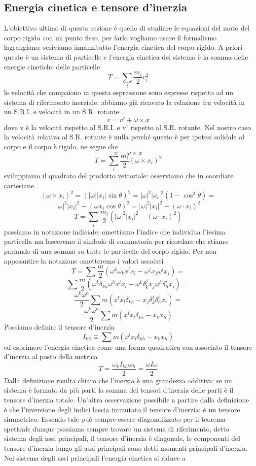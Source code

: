 \documentclass[
10pt, %
a4paper, %
oneside, %
headinclude,footinclude, %
BCOR5mm, %
]{scrartcl}
\begin{document}
 \subsection{Energia cinetica e tensore d'inerzia}
L'obiettivo ultimo di questa sezione è quello di studiare le equazioni del moto del corpo rigido con un punto fisso, per farlo vogliamo usare il formalismo lagrangiano: scriviamo innanzitutto l'energia cinetica del corpo rigido. A priori questo è un sistema di particelle e l'energia cinetica del sistema è la somma delle energie cinetiche delle particelle
\[T = \sum_i \frac{m_i}{2}v_i^2\]
le velocità che compaiono in questa espressione sono espresse rispetto ad un sistema di riferimento inerziale, abbiamo già ricavato la relazione fra velocità in un S.R.I. e velocità in un S.R. rotante
\[v = v'+\omega\times x\]
dove v è la velocità rispetto al S.R.I. e v' rispetto al S.R. rotante. Nel nostro caso la velocità relativa al S.R. rotante è nulla perché questo è per ipotesi solidale al corpo e il corpo è rigido, ne segue che
\[v = \omega\times x\]
\[T = \sum_i \frac{m_i}{2}(\omega\times x_i)^2\]
sviluppiamo il quadrato del prodotto vettoriale: osserviamo che in coordiate cartesiane
\[(\omega\times x_i)^2 = (|\omega| |x_i|\sin\theta)^2 = |\omega|^2|x_i|^2(1-\cos^2\theta) =\]
\[|\omega|^2|x_i|^2-(\omega x_i\cos\theta)^2 = |\omega|^2|x_i|^2-(\omega\cdot x_i)^2  \]
\[T = \sum_i \frac{m_i}{2}(|\omega|^2|x_i|^2-(\omega\cdot x_i)^2)\]
passiamo in notazione indiciale: omettiamo l'indice che individua l'iesima particella ma lasceremo il simbolo di sommatoria per ricordare che stiamo parlando di una somma su tutte le particelle del corpo rigido.  Per non appesantire la notazione ometteremo i valori assoluti
\[T = \sum \frac{m}{2}(\omega^k\omega_k x^lx_l-\omega^j x_j\omega^i x_i) =\]
\[ \sum \frac{m}{2}(\omega^k\delta_{kh}\omega^h x^lx_l-\omega^k\delta^{j}_k x_j\omega^h\delta^{i}_h x_i) =  \]
\[\frac{\omega^k\omega^h}{2} \sum m( x^lx_l\delta_{kh}- x_j\delta^{j}_k\delta^{i}_h x_i) = \]
\[\frac{\omega^k\omega^h}{2} \sum m( x^lx_l\delta_{kh}- x_kx_h)\]
Possiamo definire il tensore d'inerzia
\[I_{kh} \equiv \sum m( x^lx_l\delta_{kh}- x_kx_h) \]
ed esprimere l'energia cinetica come una forma quadratica con associato il tensore d'inerzia al posto della metrica
\[T=\frac{\omega_kI_{kh}\omega_h}{2} = \frac{\omega I\omega}{2} \]
Dalla definizione risulta chiaro che l'inerzia è una grandezza additiva: se un sistema è formato da più parti la somma dei tensori d'inerzia delle parti è il tensore d'inerzia totale.
Un'altra osservazione possibile a partire dalla definizione è che l'inversione degli indici lascia immutato il tensore d'inerzia: è un tensore simmetrico. Essendo tale può sempre essere diagonalizzato per il teorema spettrale dunque possiamo sempre trovare un sistema di riferimento, detto sistema degli assi principali, il tensore d'inerzia è diagonale, le componenti del tensore d'inerzia lungo gli assi principali sono detti momenti principali d'inerzia. Nel sistema degli assi principali l'energia cinetica si riduce a
\end{document}
